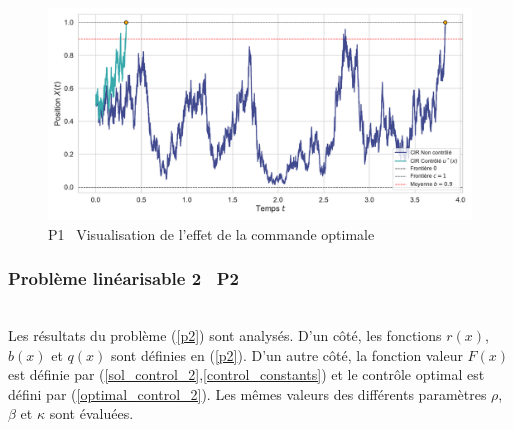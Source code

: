 \begin{figure}[htb]
    \centering
    \includegraphics[width=0.9\linewidth]{img/validation/P1/p1_control_simulation.pdf}
    \caption{P1 \textemdash~Visualisation de l'effet de la commande optimale}
\end{figure}
\FloatBarrier\subsubsection{Problème linéarisable 2 \textemdash~P2}\phantom{}\\
Les résultats du problème (\ref{p2}) sont analysés. D'un côté, les fonctions $r(x)$, $b(x)$ et $q(x)$ sont définies en (\ref{p2}). D'un autre côté, la fonction valeur $F(x)$ est définie par (\ref{sol_control_2},\ref{control_constants}) et le contrôle optimal est défini par (\ref{optimal_control_2}). Les mêmes valeurs des différents paramètres $\rho$, $\beta$ et $\kappa$ sont évaluées.
